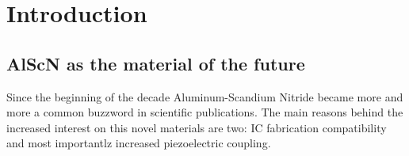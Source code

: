 \cleardoublepage
\chapter*{Introduction}

\section{AlScN as the material of the future}
Since the beginning of the decade Aluminum-Scandium Nitride became more and more a common buzzword in scientific publications. The main reasons behind the increased interest on this novel materials are two: IC fabrication compatibility and most importantlz increased piezoelectric coupling.
